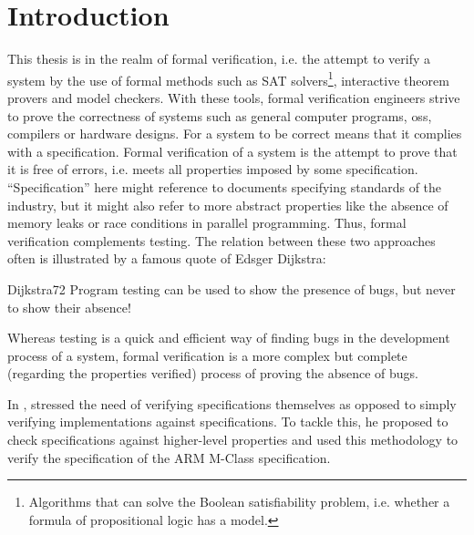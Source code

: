 
\chapter{Introduction}
\label{chp:introduction}

This thesis is in the realm of formal verification, i.e. the attempt to verify a system by the use of formal methods such as SAT solvers\footnote{%
    Algorithms that can solve the Boolean satisfiability problem, i.e. whether a formula of propositional logic has a model.
}, interactive theorem provers and model checkers.
With these tools, formal verification engineers strive to prove the correctness of systems such as general computer programs, \glspl{os}, compilers or hardware designs.
For a system to be correct means that it complies with a specification.
Formal verification of a system is the attempt to prove that it is free of errors, i.e. meets all properties imposed by some specification.
\enquote{Specification} here might reference to documents specifying standards of the industry, but it might also refer to more abstract properties like the absence of memory leaks or race conditions in parallel programming.
Thus, formal verification complements testing.
The relation between these two approaches often is illustrated by a famous quote of Edsger Dijkstra:
\begin{displaycquote}[p.6]{Dijkstra72}
    Program testing can be used to show the presence of bugs, but never to show their absence!
\end{displaycquote}

Whereas testing is a quick and efficient way of finding bugs in the development process of a system, formal verification is a more complex but complete (regarding the properties verified) process of proving the absence of bugs.

In  \cite{Reid17}, \citeauthor{Reid17} stressed the need of verifying specifications themselves as opposed to simply verifying implementations against specifications.
To tackle this, he proposed to check specifications against higher-level properties and used this methodology to verify the specification of the ARM M-Class specification.

